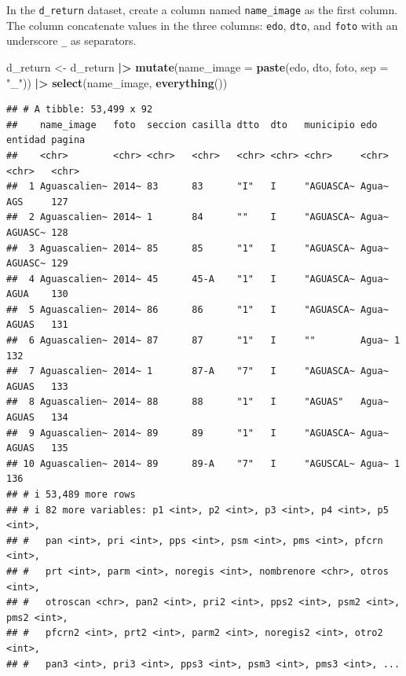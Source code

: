\documentclass[
]{article}
\newenvironment{Shaded}{\begin{snugshade}}{\end{snugshade}}
\newcommand{\AttributeTok}[1]{\textcolor[rgb]{0.13,0.29,0.53}{#1}}
\newcommand{\FunctionTok}[1]{\textcolor[rgb]{0.13,0.29,0.53}{\textbf{#1}}}
\newcommand{\NormalTok}[1]{#1}
\newcommand{\OtherTok}[1]{\textcolor[rgb]{0.56,0.35,0.01}{#1}}
\newcommand{\SpecialCharTok}[1]{\textcolor[rgb]{0.81,0.36,0.00}{\textbf{#1}}}
\newcommand{\StringTok}[1]{\textcolor[rgb]{0.31,0.60,0.02}{#1}}
\begin{document}
In the \texttt{d\_return} dataset, create a column named
\texttt{name\_image} as the first column. The column concatenate values
in the three columns: \texttt{edo}, \texttt{dto}, and \texttt{foto} with
an underscore \texttt{\_} as separators.

\begin{Shaded}
\begin{Highlighting}[]
\NormalTok{d\_return }\OtherTok{\textless{}{-}}\NormalTok{ d\_return }\SpecialCharTok{|\textgreater{}}
  \FunctionTok{mutate}\NormalTok{(}\AttributeTok{name\_image =} \FunctionTok{paste}\NormalTok{(edo, dto, foto, }\AttributeTok{sep =} \StringTok{"\_"}\NormalTok{)) }\SpecialCharTok{|\textgreater{}}
  \FunctionTok{select}\NormalTok{(name\_image, }\FunctionTok{everything}\NormalTok{())}
\end{Highlighting}
\end{Shaded}

\begin{verbatim}
## # A tibble: 53,499 x 92
##    name_image   foto  seccion casilla dtto  dto   municipio edo   entidad pagina
##    <chr>        <chr> <chr>   <chr>   <chr> <chr> <chr>     <chr> <chr>   <chr> 
##  1 Aguascalien~ 2014~ 83      83      "I"   I     "AGUASCA~ Agua~ AGS     127   
##  2 Aguascalien~ 2014~ 1       84      ""    I     "AGUASCA~ Agua~ AGUASC~ 128   
##  3 Aguascalien~ 2014~ 85      85      "1"   I     "AGUASCA~ Agua~ AGUASC~ 129   
##  4 Aguascalien~ 2014~ 45      45-A    "1"   I     "AGUASCA~ Agua~ AGUA    130   
##  5 Aguascalien~ 2014~ 86      86      "1"   I     "AGUASCA~ Agua~ AGUAS   131   
##  6 Aguascalien~ 2014~ 87      87      "1"   I     ""        Agua~ 1       132   
##  7 Aguascalien~ 2014~ 1       87-A    "7"   I     "AGUASCA~ Agua~ AGUAS   133   
##  8 Aguascalien~ 2014~ 88      88      "1"   I     "AGUAS"   Agua~ AGUAS   134   
##  9 Aguascalien~ 2014~ 89      89      "1"   I     "AGUASCA~ Agua~ AGUAS   135   
## 10 Aguascalien~ 2014~ 89      89-A    "7"   I     "AGUSCAL~ Agua~ 1       136   
## # i 53,489 more rows
## # i 82 more variables: p1 <int>, p2 <int>, p3 <int>, p4 <int>, p5 <int>,
## #   pan <int>, pri <int>, pps <int>, psm <int>, pms <int>, pfcrn <int>,
## #   prt <int>, parm <int>, noregis <int>, nombrenore <chr>, otros <int>,
## #   otroscan <chr>, pan2 <int>, pri2 <int>, pps2 <int>, psm2 <int>, pms2 <int>,
## #   pfcrn2 <int>, prt2 <int>, parm2 <int>, noregis2 <int>, otro2 <int>,
## #   pan3 <int>, pri3 <int>, pps3 <int>, psm3 <int>, pms3 <int>, ...
\end{verbatim}
\end{document}
